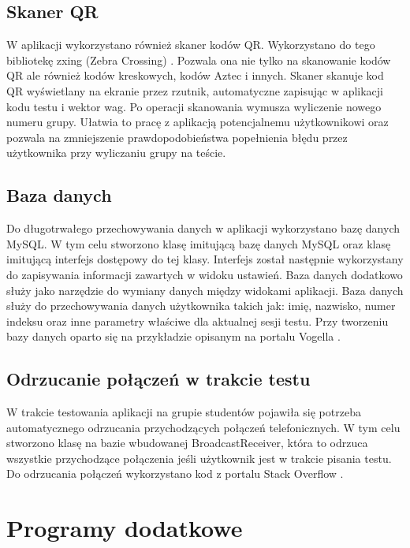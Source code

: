 \documentclass[eng]{mgr}
\begin{document}
			\subsection{Skaner QR}
			
			W aplikacji wykorzystano również skaner kodów QR. Wykorzystano do tego bibliotekę zxing (Zebra Crossing) \cite{zxing}. Pozwala ona nie tylko na skanowanie kodów QR ale również kodów kreskowych, kodów Aztec i innych. Skaner skanuje kod QR wyświetlany na ekranie przez rzutnik, automatyczne zapisując w aplikacji kodu testu i wektor wag. Po operacji skanowania wymusza wyliczenie nowego numeru grupy. Ułatwia to pracę z aplikacją potencjalnemu użytkownikowi oraz pozwala na zmniejszenie prawdopodobieństwa popełnienia błędu przez użytkownika przy wyliczaniu grupy na teście.
			
			\subsection{Baza danych}
			
			Do długotrwałego przechowywania danych w aplikacji wykorzystano bazę danych MySQL. W tym celu stworzono klasę imitującą bazę danych MySQL oraz klasę imitującą interfejs dostępowy do tej klasy. Interfejs został następnie wykorzystany do zapisywania informacji zawartych w widoku ustawień. Baza danych dodatkowo służy jako narzędzie do wymiany danych między widokami aplikacji. Baza danych służy do przechowywania danych użytkownika takich jak: imię, nazwisko, numer indeksu oraz inne parametry właściwe dla aktualnej sesji testu. Przy tworzeniu bazy danych oparto się na przykładzie opisanym na portalu Vogella \cite{sqlitedatabase}.
			
			\subsection{Odrzucanie połączeń w trakcie testu}
			
			W trakcie testowania aplikacji na grupie studentów pojawiła się potrzeba automatycznego odrzucania przychodzących połączeń telefonicznych. W tym celu stworzono klasę na bazie wbudowanej BroadcastReceiver, która to odrzuca wszystkie przychodzące połączenia jeśli użytkownik jest w trakcie pisania testu. Do odrzucania połączeń wykorzystano kod z portalu Stack Overflow \cite{callreject}.
			
		\section{Programy dodatkowe}
		
\end{document}
